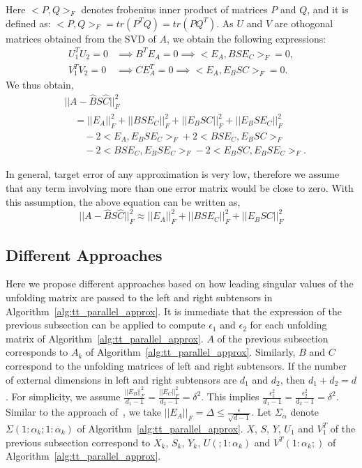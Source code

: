 \documentclass[sigconf]{acmart}
\begin{document}
\noindent Here $<P, Q>_F$ denotes frobenius inner product of matrices $P$ and $Q$, and it is defined as: $<P, Q>_F = tr(P^TQ) = tr(PQ^T)$. As $U$ and $V$ are othogonal matrices obtained from the SVD of $A$, we obtain the following expressions:
\begin{align*}
U_1^TU_2 = 0 & \implies B^TE_A = 0 \implies <E_A, BSE_C>_F = 0, \\
V_1^TV_2 = 0 & \implies CE_A^T = 0 \implies <E_A, E_BSC>_F = 0. 
\end{align*}
We thus obtain,
\begin{align*}
&||A - \hat{B} S \hat{C}||_F^2 \\
&\quad= ||E_A||_F^2 + ||BSE_C||_F^2 + ||E_BSC||_F^2 + ||E_BSE_C||_F^2 \\
&\quad\quad -2 <E_A, E_BSE_C>_F + 2 <BSE_C, E_BSC>_F\\
&\quad\quad -2 <BSE_C, E_BSE_C>_F - 2<E_BSC, E_BSE_C>_F.
\end{align*}

\noindent In general, target error of any approximation is very low, therefore we assume that any term involving more than one error matrix would be close to zero. With this assumption, the above equation can be written as,
\begin{equation*}
||A - \hat{B} S \hat{C}||_F^2 \approx ||E_A||_F^2 + ||BSE_C||_F^2 + ||E_BSC||_F^2
\end{equation*}

\subsection{Different Approaches}
\label{sec:approaches:all}
Here we propose different approaches based on how leading singular values of the unfolding matrix are passed to the left and right subtensors in Algorithm~\ref{alg:tt_parallel_approx}. It is immediate that the expression of the previous subsection can be applied to compute $\epsilon_1$ and $\epsilon_2$ for each unfolding matrix of Algorithm~\ref{alg:tt_parallel_approx}. $A$ of the previous subsection corresponds to $A_k$ of Algorithm~\ref{alg:tt_parallel_approx}. Similarly, $B$ and $C$ correspond to the unfolding matrices of left and right subtensors. If the number of external dimensions in left and right subtensors are $d_1$ and $d_2$, then $d_1 + d_2 = d$. For simplicity, we assume $\frac{||E_B||_F^2}{d_1-1} = \frac{||E_C||_F^2}{d_2-1} = \delta^2$. This implies $\frac{\epsilon_1^2}{d_1-1} = \frac{\epsilon_2^2}{d_2-1} = \delta^2$. Similar to the approach of~\cite{tt}, we take $||E_A||_F=\Delta \le \frac{\epsilon}{\sqrt{d-1}}$. Let $\Sigma_\alpha$ denote $\Sigma(1:\alpha_k;1:\alpha_k)$ of Algorithm~\ref{alg:tt_parallel_approx}. $X$, $S$, $Y$, $U_1$ and $V_1^T$ of the previous subsection correspond to $X_k$, $S_k$, $Y_k$, $U(;1:\alpha_k)$ and $V^T(1:\alpha_k;)$ of Algorithm~\ref{alg:tt_parallel_approx}. 
\end{document}
